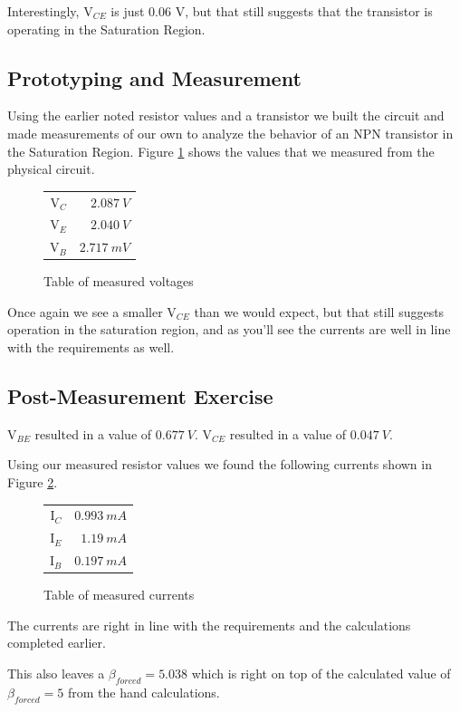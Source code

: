 \documentclass{article}
\begin{document}
Interestingly, V$_{CE}$ is just 0.06 V, but 
that still suggests that the transistor is
operating in the Saturation Region.

\subsection{Prototyping and Measurement}

Using the earlier noted resistor values and a transistor
we built the circuit and made measurements of our own
to analyze the behavior of an NPN transistor in the
Saturation Region. Figure \ref{table:satTableMeas} shows
the values that we measured from the physical circuit.

\begin{figure}[h!]
  \begin{center}
    \begin{tabular}{r|r}
      V$_C$ & $\SI{2.087}{V}$ \\
      V$_E$ & $\SI{2.040}{V}$ \\
      V$_B$ & $\SI{2.717}{mV}$ \\

    \end{tabular}
  \end{center}
  \caption{Table of measured voltages}
  \label{table:satTableMeas}
\end{figure}

Once again we see a smaller V$_{CE}$ than we would expect, but that still suggests operation in the saturation region, and as you'll see the currents are well in line with the requirements as well.

\subsection{Post-Measurement Exercise}

V$_{BE}$ resulted in a value of $\SI{0.677}{V}$.
V$_{CE}$ resulted in a value of $\SI{0.047}{V}$.

Using our measured resistor values we found 
the following currents shown in Figure
\ref{table:satTableMeasCurrent}.

\begin{figure}[h!]
  \begin{center}
    \begin{tabular}{r|r}
      I$_C$ & $\SI{0.993}{mA}$ \\
      I$_E$ & $\SI{1.19}{mA}$ \\
      I$_B$ & $\SI{0.197}{mA}$ \\

    \end{tabular}
  \end{center}
  \caption{Table of measured currents}
  \label{table:satTableMeasCurrent}
\end{figure}

The currents are right in line with the requirements
and the calculations completed earlier.

This also leaves a $\beta_{forced}=5.038$ which is 
right on top of the calculated value of $\beta_{forced}=5$
from the hand calculations.
\end{document}
